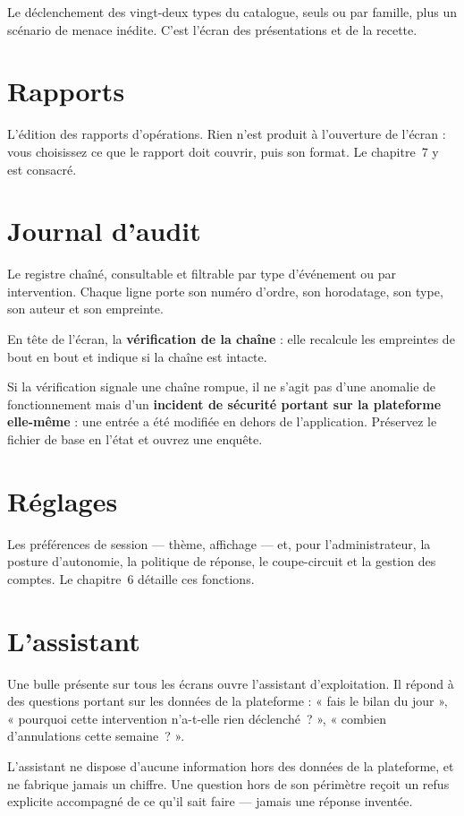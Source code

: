 Le déclenchement des vingt-deux types du catalogue, seuls ou par famille, plus
un scénario de menace inédite. C'est l'écran des présentations et de la
recette.

\section{Rapports}

L'édition des rapports d'opérations. Rien n'est produit à l'ouverture de
l'écran : vous choisissez ce que le rapport doit couvrir, puis son format.
Le chapitre~7 y est consacré.

\section{Journal d'audit}

Le registre chaîné, consultable et filtrable par type d'événement ou par
intervention. Chaque ligne porte son numéro d'ordre, son horodatage, son type,
son auteur et son empreinte.

En tête de l'écran, la \textbf{vérification de la chaîne} : elle recalcule les
empreintes de bout en bout et indique si la chaîne est intacte.

\begin{tcolorbox}[colback=orange!5!white, colframe=orange!70!black,
  title=\textbf{Attention}, fonttitle=\bfseries, boxrule=0.6pt]
Si la vérification signale une chaîne rompue, il ne s'agit pas d'une anomalie
de fonctionnement mais d'un \textbf{incident de sécurité portant sur la
plateforme elle-même} : une entrée a été modifiée en dehors de l'application.
Préservez le fichier de base en l'état et ouvrez une enquête.
\end{tcolorbox}

\section{Réglages}

Les préférences de session — thème, affichage — et, pour l'administrateur, la
posture d'autonomie, la politique de réponse, le coupe-circuit et la gestion
des comptes. Le chapitre~6 détaille ces fonctions.

\section{L'assistant}

Une bulle présente sur tous les écrans ouvre l'assistant d'exploitation. Il
répond à des questions portant sur les données de la plateforme : « fais le
bilan du jour », « pourquoi cette intervention n'a-t-elle rien déclenché~? »,
« combien d'annulations cette semaine~? ».

\begin{tcolorbox}[colback=green!4!white, colframe=darkgreen,
  title=\textbf{Bon à savoir}, fonttitle=\bfseries, boxrule=0.6pt]
L'assistant ne dispose d'aucune information hors des données de la plateforme,
et ne fabrique jamais un chiffre. Une question hors de son périmètre reçoit un
refus explicite accompagné de ce qu'il sait faire — jamais une réponse inventée.
\end{tcolorbox}
